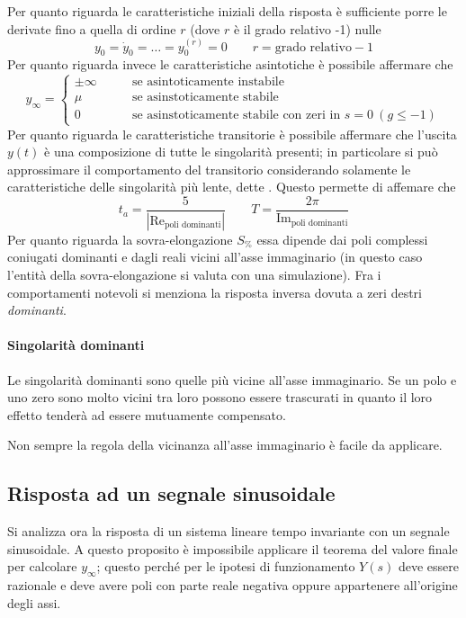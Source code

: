 		Per quanto riguarda le caratteristiche iniziali della risposta è sufficiente porre le derivate fino a quella di ordine $r$ (dove $r$ è il grado relativo -1) nulle
		\[ y_0=\dot y_0=\dots =  y_0^{(r)} = 0\qquad r=\textrm{grado relativo} -1\]
		Per quanto riguarda invece le caratteristiche asintotiche è possibile affermare che
		\[ y_\infty = \begin{cases}
			\pm \infty \qquad & \textrm{se asintoticamente instabile} \\
			\mu & \textrm{se asinstoticamente stabile} \\
			0 & \textrm{se asinstoticamente stabile con zeri in } s=0 \ (g\leq -1)
		\end{cases}\]
		Per quanto riguarda le caratteristiche transitorie è possibile affermare che l'uscita $y(t)$ è una composizione di tutte le singolarità presenti; in particolare si può approssimare il comportamento del transitorio considerando solamente le caratteristiche delle singolarità più lente, dette . Questo permette di affemare che
		\[ t_a = \frac 5 {|\textrm{Re}_\textrm{poli dominanti}|} \qquad T = \frac{2\pi}{\textrm{Im}_\textrm{poli dominanti}}\]
		Per quanto riguarda la sovra-elongazione $S_\%$ essa dipende dai poli complessi coniugati dominanti e dagli reali vicini all'asse immaginario (in questo caso l'entità della sovra-elongazione si valuta con una simulazione).
		Fra i comportamenti notevoli si menziona la risposta inversa dovuta a zeri destri \textit{dominanti}.
		
		\paragraph{Singolarità dominanti}Le singolarità dominanti sono quelle più vicine all'asse immaginario. Se un polo e uno zero sono molto vicini tra loro possono essere trascurati in quanto il loro effetto tenderà ad essere mutuamente compensato.
		
		\begin{nota}
			Non sempre la regola della vicinanza all'asse immaginario è facile da applicare.
		\end{nota}
	
	\subsection{Risposta ad un segnale sinusoidale}
		Si analizza ora la risposta di un sistema lineare tempo invariante con un segnale sinusoidale. A questo proposito è impossibile applicare il teorema del valore finale per calcolare $y_\infty$; questo perché per le ipotesi di funzionamento $Y(s)$ deve essere razionale e deve avere poli con parte reale negativa oppure appartenere all'origine degli assi.
		

